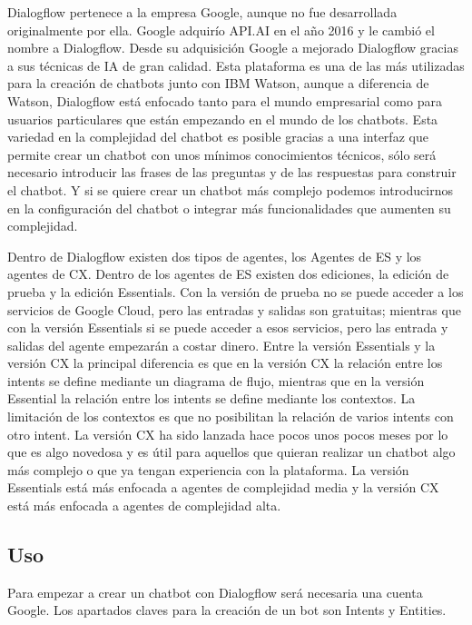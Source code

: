Dialogflow pertenece a la empresa Google, aunque no fue desarrollada originalmente por ella. Google adquirío API.AI en el año 2016 y le cambió el nombre a Dialogflow. Desde su adquisición Google a mejorado Dialogflow gracias a sus técnicas de IA de gran calidad. Esta plataforma es una de las más utilizadas para la creación de chatbots junto con IBM Watson, aunque a diferencia de Watson, Dialogflow está enfocado tanto para el mundo empresarial como para usuarios particulares que están empezando en el mundo de los chatbots. Esta variedad en la complejidad del chatbot es posible gracias a una interfaz que permite crear un chatbot con unos mínimos conocimientos técnicos, sólo será necesario introducir las frases de las preguntas y de las respuestas para construir el chatbot. Y si se quiere crear un chatbot más complejo podemos introducirnos en la configuración del chatbot o integrar más funcionalidades que aumenten su complejidad.

Dentro de Dialogflow existen dos tipos de agentes, los Agentes de ES y los agentes de CX. Dentro de los agentes de ES existen dos ediciones, la edición de prueba y la edición Essentials. Con la versión de prueba no se puede acceder a los servicios de Google Cloud, pero las entradas y salidas son gratuitas; mientras que con la versión Essentials si se puede acceder a esos servicios, pero las entrada y salidas del agente empezarán a costar dinero. Entre la versión Essentials y la versión CX la principal diferencia es que en la versión CX la relación entre los intents se define mediante un diagrama de flujo, mientras que en la versión Essential la relación entre los intents se define mediante los contextos. La limitación de los contextos es que no posibilitan la relación de varios intents con otro intent. La versión CX ha sido lanzada hace pocos unos pocos meses por lo que es algo novedosa y es útil para aquellos que quieran realizar un chatbot algo más complejo o que ya tengan experiencia con la plataforma. La versión Essentials está más enfocada a agentes de complejidad media y la versión CX está más enfocada a agentes de complejidad alta.

\subsection*{Uso}

Para empezar a crear un chatbot con Dialogflow será necesaria una cuenta Google. Los apartados claves para la creación de un bot son Intents y Entities.

